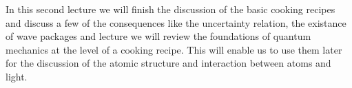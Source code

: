 In this second lecture we will finish the discussion of the basic cooking recipes and discuss a few of the consequences like the uncertainty relation, the existance of wave packages and  lecture we will review the foundations of quantum mechanics at the level of a cooking recipe. This will enable us to use them later for the discussion of the atomic structure and interaction between atoms and light.